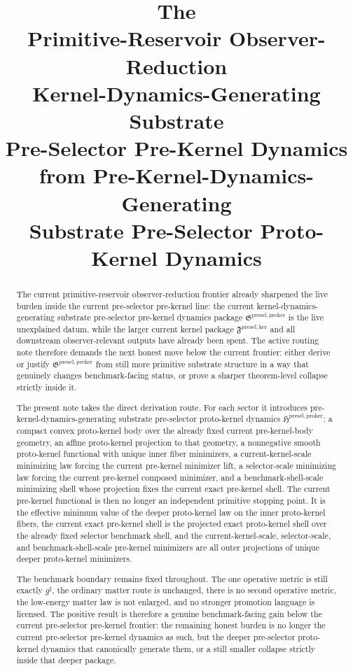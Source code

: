 \documentclass[11pt]{article}
\title{\textbf{The \TheoryName{}}\\[0.4em]
\large Primitive-Reservoir Observer-Reduction\\
\large Kernel-Dynamics-Generating Substrate\\
\large Pre-Selector Pre-Kernel Dynamics\\
\large from Pre-Kernel-Dynamics-Generating\\
\large Substrate Pre-Selector Proto-Kernel Dynamics}
\author{}
\date{}
\newcommand{\CompletedMetric}{g^{\sharp}}
\newcommand{\KernelPackage}{\mathfrak F^{\mathrm{presel,ker}}}
\newcommand{\PreKernelPackage}{\mathfrak G^{\mathrm{presel,preker}}}
\newcommand{\ProtoKernelPackage}{\mathfrak H^{\mathrm{presel,proker}}}
\begin{document}
\maketitle

\begin{abstract}
The current primitive-reservoir observer-reduction frontier already sharpened the live burden inside the current pre-selector pre-kernel line: the current kernel-dynamics-generating substrate pre-selector pre-kernel dynamics package \(\PreKernelPackage\) is the live unexplained datum, while the larger current kernel package \(\KernelPackage\) and all downstream observer-relevant outputs have already been spent. The active routing note therefore demands the next honest move below the current frontier: either derive or justify \(\PreKernelPackage\) from still more primitive substrate structure in a way that genuinely changes benchmark-facing status, or prove a sharper theorem-level collapse strictly inside it.

The present note takes the direct derivation route. For each sector it introduces pre-kernel-dynamics-generating substrate pre-selector proto-kernel dynamics \(\ProtoKernelPackage\): a compact convex proto-kernel body over the already fixed current pre-kernel-body geometry, an affine proto-kernel projection to that geometry, a nonnegative smooth proto-kernel functional with unique inner fiber minimizers, a current-kernel-scale minimizing law forcing the current pre-kernel minimizer lift, a selector-scale minimizing law forcing the current pre-kernel composed minimizer, and a benchmark-shell-scale minimizing shell whose projection fixes the current exact pre-kernel shell. The current pre-kernel functional is then no longer an independent primitive stopping point. It is the effective minimum value of the deeper proto-kernel law on the inner proto-kernel fibers, the current exact pre-kernel shell is the projected exact proto-kernel shell over the already fixed selector benchmark shell, and the current-kernel-scale, selector-scale, and benchmark-shell-scale pre-kernel minimizers are all outer projections of unique deeper proto-kernel minimizers.

The benchmark boundary remains fixed throughout. The one operative metric is still exactly \(\CompletedMetric\), the ordinary matter route is unchanged, there is no second operative metric, the low-energy matter law is not enlarged, and no stronger promotion language is licensed. The positive result is therefore a genuine benchmark-facing gain below the current pre-selector pre-kernel frontier: the remaining honest burden is no longer the current pre-selector pre-kernel dynamics as such, but the deeper pre-selector proto-kernel dynamics that canonically generate them, or a still smaller collapse strictly inside that deeper package.
\end{abstract}
\end{document}
